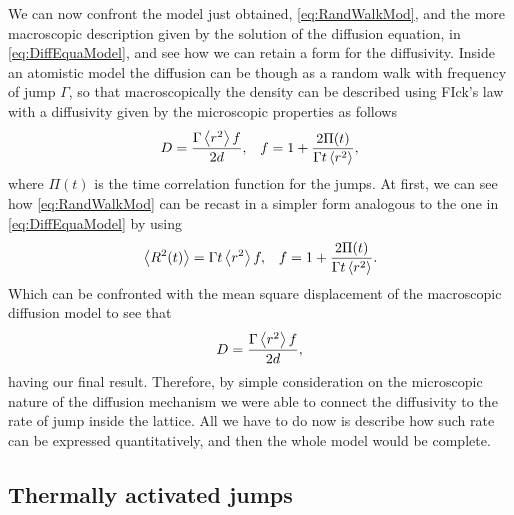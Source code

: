 We can now confront the model just obtained, \eqref{eq:RandWalkMod}, and the more macroscopic description given by the solution of the diffusion equation, in \eqref{eq:DiffEquaModel}, and see how we can retain a form for the diffusivity.
{
    Inside an atomistic model the diffusion can be though as a random walk with frequency of jump $\Gamma$, so that macroscopically the density can be described using FIck's law with a diffusivity given by the microscopic properties as follows 
    \begin{align}
        \label{eq:MicroDiff}
        &D = \frac{\Gamma\left\langle r^2 \right\rangle f}{2d}, &f = 1 + \frac{2\Pi(t)}{\Gamma t\left\langle r^2 \right\rangle},
    \end{align}
    where $\Pi(t)$ is the time correlation function for the jumps.
}
{
    At first, we can see how \eqref{eq:RandWalkMod} can be recast in a simpler form analogous to the one in \eqref{eq:DiffEquaModel} by using
    \begin{align}
        &\left\langle R^2(t) \right\rangle = \Gamma t\left\langle r^2 \right\rangle f, &f = 1 + \frac{2\Pi(t)}{\Gamma t\left\langle r^2 \right\rangle}.
    \end{align}
    Which can be confronted with the mean square displacement of the macroscopic diffusion model to see that
    \begin{equation}
        D = \frac{\Gamma\left\langle r^2 \right\rangle f}{2d},
    \end{equation}
    having our final result.
}
\noindent
Therefore, by simple consideration on the microscopic nature of the diffusion mechanism we were able to connect the diffusivity to the rate of jump inside the lattice. All we have to do now is describe how such rate can be expressed quantitatively, and then the whole model would be complete.

\subsection{Thermally activated jumps}

